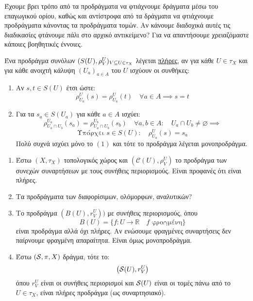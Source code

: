 \vspace{0.3cm}

Έχουμε βρει τρόπο από τα προδράγματα να φτιάχνουμε δράγματα μέσω του επαγωγικού ορίου, καθώς και αντίστροφα από τα δράγματα να φτιάχνουμε προδράγματα κάνοντας τα προδράγματα τομών. Αν κάνουμε διαδοχικά αυτές τις διαδικασίες φτάνουμε πάλι στο αρχικό αντικείμενο? Για να απαντήσουμε χρειαζόμαστε κάποιες βοηθητικές έννοιες.


\begin{defn} Ένα προδράγμα συνόλων $(S(U),\rho^U_V)_{V\subseteq U\in \tau_X}$ λέγεται \underline{πλήρες}, αν για κάθε $U\in \tau_X$ και για κάθε ανοιχτή κάλυψη $(U_a)_{a \in A}$ του $U$ ισχύουν οι συνθήκες:
    \begin{enumerate}
        \item Αν $s,t \in S(U)$ έτσι ώστε:
        $$\rho^U_{U_a} (s) = \rho^U_{U_a}(t) \quad \forall a \in A \implies s = t$$

        \item Για τα $s_a \in S(U_a)$ για κάθε $a \in A$ ισχύει:
        $$\rho^{U_a}_{U_a \cap U_b} (s_a) = \rho^{U_b}_{U_a \cap U_b} (s_b) \quad \forall a,b \in A: \quad U_a \cap U_b \neq \varnothing \implies$$
        $$\text{Υπάρχει } s \in S(U): \quad \rho^U_{U_a}(s) = s_a$$ Πολύ συχνά ισχύει μόνο το $(1)$ και τότε το προδράγμα λέγεται μονοπροδράγμα.
    \end{enumerate}
\end{defn}


\begin{example}
\end{example}
\begin{enumerate}
    \item Έστω $(X,\tau_X)$ τοπολογικός χώρος και $\left(\mathcal{C}(U),\rho^U_V\right)$ το προδράγμα των συνεχών συναρτήσεων με τους συνήθεις περιορισμούς. Είναι προφανές ότι είναι πλήρες.
    \item Τα προδράγματα των διαφορίσιμων, ολόμορφων, αναλυτικών?
    \item Το προδράγμα $(B(U),r^U_V))$ με συνήθεις περιορισμούς, όπου
    $$B(U) = \{f: U \rightarrow \mathbb{R} \quad f \text{ φραγμένη}\}$$ είναι προδράγμα αλλά όχι πλήρες. Αν ενώσουμε φραγμένες συναρτήσεις δεν παίρνουμε φραγμένη απαραίτητα. Είναι όμως μονοπροδράγμα.

    \item Έστω $(\mathcal{S}, \pi, X)$ δράγμα, τότε το:
    $$\left(\mathcal{S} (U),r^U_V\right)$$ όπου $r^U_V$ είναι οι συνήθεις περιορισμοί και $\mathcal{S} (U)$ είναι οι τομές πάνω από το $U \in \tau_X$, είναι πλήρες προδράγμα (ως συναρτησιακό).

\end{enumerate}

